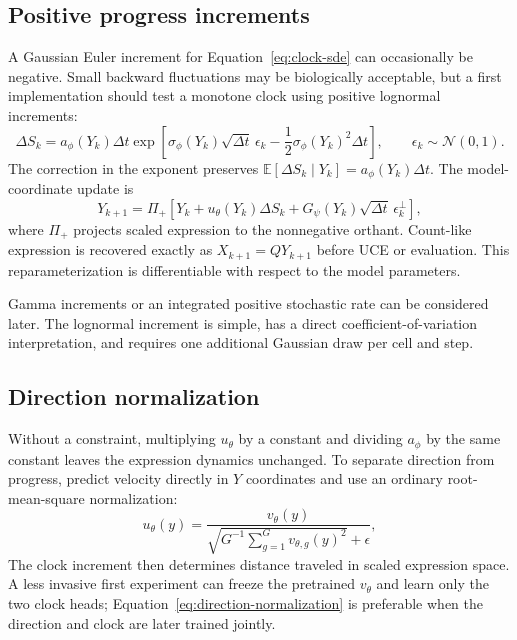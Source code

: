 \documentclass[11pt]{article}
\newcommand{\uce}{UCE}
\newcommand{\E}{\mathbb{E}}
\newcommand{\N}{\mathcal{N}}
\begin{document}
\subsection{Positive progress increments}

A Gaussian Euler increment for Equation~\ref{eq:clock-sde} can occasionally be
negative. Small backward fluctuations may be biologically acceptable, but a
first implementation should test a monotone clock using positive lognormal
increments:
\begin{equation}
  \Delta S_k
  = a_\phi(Y_k)\Delta t
    \exp\!\left[
      \sigma_\phi(Y_k)\sqrt{\Delta t}\,\epsilon_k
      -\frac{1}{2}\sigma_\phi(Y_k)^2\Delta t
    \right],
  \qquad \epsilon_k\sim\N(0,1).
  \label{eq:positive-increment}
\end{equation}
The correction in the exponent preserves
$\E[\Delta S_k\mid Y_k]=a_\phi(Y_k)\Delta t$. The model-coordinate update is
\begin{equation}
  Y_{k+1}=\Pi_+\!\left[
    Y_k+u_\theta(Y_k)\Delta S_k
    +G_\psi(Y_k)\sqrt{\Delta t}\,\epsilon_k^\perp
  \right],
  \label{eq:clock-rollout}
\end{equation}
where $\Pi_+$ projects scaled expression to the nonnegative orthant. Count-like
expression is recovered exactly as $X_{k+1}=QY_{k+1}$ before \uce{} or
evaluation. This reparameterization is differentiable with respect to the
model parameters.

Gamma increments or an integrated positive stochastic rate can be considered
later. The lognormal increment is simple, has a direct
coefficient-of-variation interpretation, and requires one additional Gaussian
draw per cell and step.

\subsection{Direction normalization}

Without a constraint, multiplying $u_\theta$ by a constant and dividing
$a_\phi$ by the same constant leaves the expression dynamics unchanged. To
separate direction from progress, predict velocity directly in $Y$ coordinates
and use an ordinary root-mean-square normalization:
\begin{equation}
  u_\theta(y)
  = \frac{v_\theta(y)}
      {\sqrt{G^{-1}\sum_{g=1}^{G}v_{\theta,g}(y)^2}+\epsilon},
  \label{eq:direction-normalization}
\end{equation}
The clock increment then determines distance traveled in scaled expression
space. A less invasive
first experiment can freeze the pretrained $v_\theta$ and learn only the two
clock heads; Equation~\ref{eq:direction-normalization} is preferable when the
direction and clock are later trained jointly.
\end{document}

